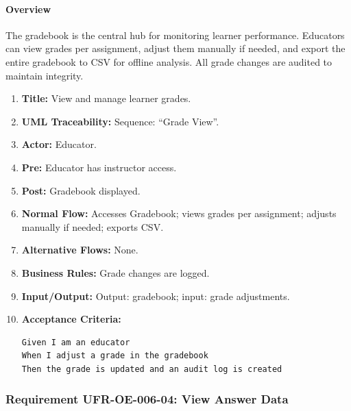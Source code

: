 \paragraph{Overview}
The gradebook is the central hub for monitoring learner performance. Educators can view grades per assignment, adjust them manually if needed, and export the entire gradebook to CSV for offline analysis. All grade changes are audited to maintain integrity.
\begin{enumerate}[label=\textbf{\arabic*.}]
\item \textbf{Title:} View and manage learner grades.
\item \textbf{UML Traceability:} Sequence: “Grade View”.
\item \textbf{Actor:} Educator.
\item \textbf{Pre:} Educator has instructor access.
\item \textbf{Post:} Gradebook displayed.
\item \textbf{Normal Flow:} Accesses Gradebook; views grades per assignment; adjusts manually if needed; exports CSV.
\item \textbf{Alternative Flows:} None.
\item \textbf{Business Rules:} Grade changes are logged.
\item \textbf{Input/Output:} Output: gradebook; input: grade adjustments.
\item \textbf{Acceptance Criteria:}
    \begin{verbatim}
Given I am an educator
When I adjust a grade in the gradebook
Then the grade is updated and an audit log is created
    \end{verbatim}
\end{enumerate}

\subsubsection{Requirement UFR-OE-006-04: View Answer Data}
